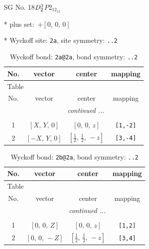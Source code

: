 \documentclass[fleqn,8pt]{jsarticle}
\begin{document}
\setcounter{MaxMatrixCols}{32}

\renewcommand{\tablename}{Table~}
\renewcommand{\figurename}{Figure~}
\begin{center}
\LARGE
SG No. 18\quad$D_{\rm 2}^{3}$\quad$P2_12_12$\quad[ orthorhombic ]
\end{center}

* plus set:\,\,\,$+\left[ 0,\, 0,\, 0 \right]$


* Wyckoff site: {\tt 2a}, site symmetry: {\tt ..2}
\renewcommand{\arraystretch}{1.2}
\begin{longtable}{cccc}
\caption{Wyckoff bond: {\tt 2a@2a}, bond symmetry: {\tt ..2}}
 \\
 \hline \hline
No. & vector & center & mapping \\ \hline \endfirsthead

\multicolumn{3}{l}{\tablename\ \thetable{}} \\
 \hline \hline
No. & vector & center & mapping \\ \hline \endhead

 \hline \hline
\multicolumn{3}{r}{\footnotesize\it continued ...} \\ \endfoot

 \hline \hline
\multicolumn{3}{r}{} \\ \endlastfoot

1 & $\left[ X,\, Y,\, 0 \right]$ & $\left[ 0,\, 0,\, z \right]$ & {\tt [1,-2]} \\ \hline
2 & $\left[ - X,\, Y,\, 0 \right]$ & $\left[ \frac{1}{2},\, \frac{1}{2},\, - z \right]$ & {\tt [3,-4]} \\
\end{longtable}
\renewcommand{\arraystretch}{1.2}
\begin{longtable}{cccc}
\caption{Wyckoff bond: {\tt 2b@2a}, bond symmetry: {\tt ..2}}
 \\
 \hline \hline
No. & vector & center & mapping \\ \hline \endfirsthead

\multicolumn{3}{l}{\tablename\ \thetable{}} \\
 \hline \hline
No. & vector & center & mapping \\ \hline \endhead

 \hline \hline
\multicolumn{3}{r}{\footnotesize\it continued ...} \\ \endfoot

 \hline \hline
\multicolumn{3}{r}{} \\ \endlastfoot

1 & $\left[ 0,\, 0,\, Z \right]$ & $\left[ 0,\, 0,\, z \right]$ & {\tt [1,2]} \\ \hline
2 & $\left[ 0,\, 0,\, - Z \right]$ & $\left[ \frac{1}{2},\, \frac{1}{2},\, - z \right]$ & {\tt [3,4]} \\
\end{longtable}
\end{document}
